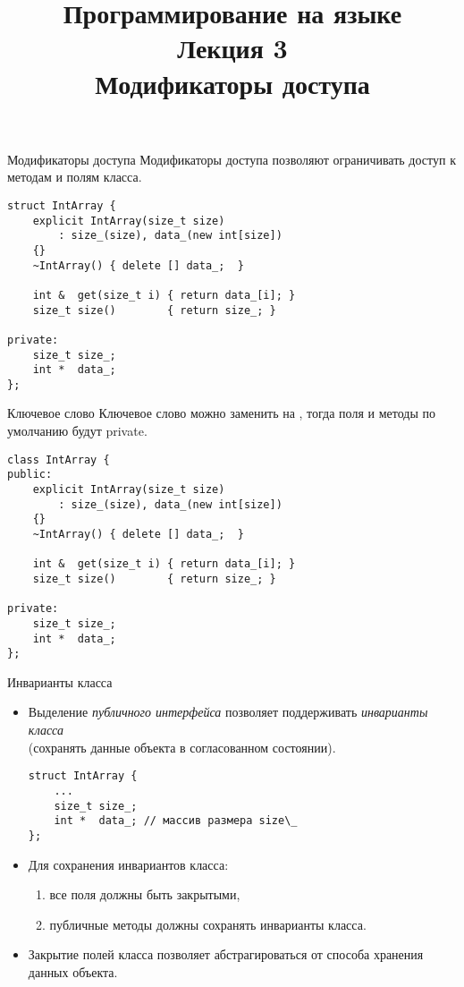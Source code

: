 \documentclass{beamer}
\title{{\bf Программирование на языке \langcpp\protect\\Лекция
3\protect\vspace{1em}\\}Модификаторы доступа}
\begin{document}
\begin{frame} 
  \titlepage
\end{frame}

\begin{frame}[fragile]{Модификаторы доступа}{}
    Модификаторы доступа позволяют ограничивать 
    доступ к методам и полям класса.
\begin{lstlisting}
struct IntArray {
    explicit IntArray(size_t size) 
        : size_(size), data_(new int[size]) 
    {}
    ~IntArray() { delete [] data_;  }

    int &  get(size_t i) { return data_[i]; }
    size_t size()        { return size_; }

private:
    size_t size_;
    int *  data_;
};
\end{lstlisting}
\end{frame}

\begin{frame}[fragile]{Ключевое слово }{}
    Ключевое слово  можно заменить на 
    , тогда поля и методы
    по умолчанию будут private.

\begin{lstlisting}
class IntArray {
public:
    explicit IntArray(size_t size) 
        : size_(size), data_(new int[size]) 
    {}
    ~IntArray() { delete [] data_;  }

    int &  get(size_t i) { return data_[i]; }
    size_t size()        { return size_; }

private:
    size_t size_;
    int *  data_;
};
\end{lstlisting}
\end{frame}

\begin{frame}[fragile]{Инварианты класса}{}
    \begin{itemize}
        \item Выделение {\em публичного интерфейса} позволяет
            поддерживать {\em инварианты класса}\\
            (сохранять
            данные объекта в согласованном состоянии).
\begin{lstlisting}
struct IntArray {
    ...
    size_t size_;
    int *  data_; // массив размера size\_
};
\end{lstlisting}
        
        \item Для сохранения инвариантов класса:
            \begin{enumerate}
                \item все поля должны быть закрытыми, 
                \item публичные методы должны сохранять инварианты класса.
            \end{enumerate}

        \item Закрытие полей класса позволяет абстрагироваться 
            от способа хранения данных объекта.
    \end{itemize}
\end{frame}
\end{document}
